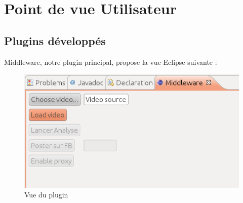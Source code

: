 \chapter{Point de vue Utilisateur}

\section{Plugins développés}
Middleware, notre plugin principal, propose la vue Eclipse suivante : 
  \begin{figure}[h]
	  \centering
	  \includegraphics[scale=0.50]{img/Capture}
	  \caption{Vue du plugin}
	  \label{fig:vue}
\end{figure} 

